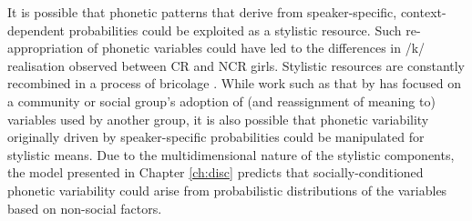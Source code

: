 \largerpage
It is possible that phonetic patterns that derive from speaker-specific, context-dependent probabilities could be exploited as a stylistic resource. Such re-ap\-pro\-pri\-a\-tion of phonetic variables could have led to the differences in /k/ realisation observed between CR and NCR girls. Stylistic resources are constantly recombined in a process of bricolage \citep{hebdige1984,eckert2008}. While work such as that by \citet{milroymilroy1978} has focused on a community or social group's adoption of (and reassignment of meaning to) variables used by another group, it is also possible that phonetic variability originally driven by speaker-specific probabilities could be manipulated for stylistic means. Due to the multidimensional nature of the stylistic components, the model presented in Chapter \ref{ch:disc} predicts that socially-conditioned phonetic variability could arise from probabilistic distributions of the variables based on non-social factors.












